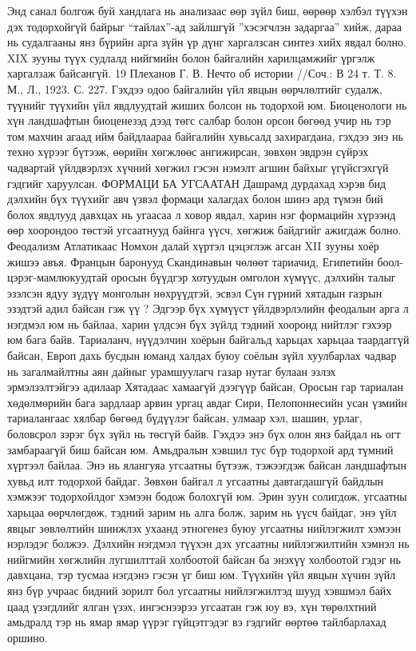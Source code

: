 Энд санал болгож буй хандлага нь анализаас өөр зүйл биш, өөрөөр хэлбэл түүхэн дэх тодорхойгүй байрыг “тайлах”-ад зайлшгүй ”хэсэгчлэн задаргаа” хийж, дараа нь судалгааны янз бүрийн арга зүйн үр дүнг харгалзсан синтез хийх явдал болно.
XIX зууны түүх судлалд нийгмийн болон байгалийн харилцамжийг үргэлж харгалзаж байсангүй.
19 Плеханов Г. В. Нечто об истории //Соч.: В 24 т. Т. 8. М., Л., 1923. С. 227.
Гэхдээ одоо байгалийн үйл явцын өөрчлөлтийг судалж, түүнийг түүхийн үйл явдлуудтай жиших болсон нь тодорхой юм. Биоценологи нь хүн ландшафтын биоценезэд дээд төгс салбар болон орсон бөгөөд учир нь тэр том махчин агаад ийм байдлаараа байгалийн хувьсалд захирагдана, гэхдээ энэ нь техно хүрээг бүтээж, өөрийн хөгжлөөс ангижирсан, зөвхөн эвдрэн сүйрэх чадвартай үйлдвэрлэх хүчний хөгжил гэсэн нэмэлт агшин байхыг үгүйсгэхгүй гэдгийг харуулсан.
ФОРМАЦИ БА УГСААТАН
Дашрамд дурдахад хэрэв бид дэлхийн бүх түүхийг авч үзвэл формаци халагдах болон шинэ ард түмэн бий болох явдлууд давхцах нь угаасаа л ховор явдал, харин нэг формацийн хүрээнд өөр хоорондоо төстэй угсаатнууд байнга үүсч, хөгжиж байдгийг ажигдаж болно.
Феодализм Атлатикаас Номхон далай хүртэл цэцэглэж агсан XII зууны хоёр жишээ авъя. Францын баронууд Скандинавын чөлөөт тариачид, Египетийн боол-цэрэг-мамлюкуудтай оросын бүүдгэр хотуудын омголон хүмүүс, дэлхийн талыг эзэлсэн ядуу зүдүү монголын нөхрүүдтэй, эсвэл Сүн гүрний хятадын газрын эзэдтэй адил байсан гэж үү ? Эдгээр бүх хүмүүст үйлдвэрлэлийн феодалын арга л нэгдмэл юм нь байлаа, харин үлдсэн бүх зүйлд тэдний хооронд нийтлэг гэхээр юм бага байв. Тариаланч, нүүдэлчин хоёрын байгальд харьцах харьцаа таардаггүй байсан, Европ дахь бусдын юманд халдах буюу соёлын зүйл хуулбарлах чадвар нь загалмайлтны аян дайныг урамшуулагч газар нутаг булаан эзлэх эрмэлзэлтэйгээ адилаар Хятадаас хамаагүй дээгүүр байсан, Оросын гар тариалан хөдөлмөрийн бага зардлаар арвин ургац авдаг Сири, Пелопоннесийн усан үзмийн тариалангаас хялбар бөгөөд бүдүүлэг байсан, улмаар хэл, шашин, урлаг, боловсрол зэрэг бүх зүйл нь төсгүй байв. Гэхдээ энэ бүх олон янз байдал нь огт замбараагүй биш байсан юм. Амьдралын хэвшил тус бүр тодорхой ард түмний хүртээл байлаа. Энэ нь ялангуяа угсаатны бүтээж, тэжээгдэж байсан ландшафтын хувьд илт тодорхой байдаг.
Зөвхөн байгал л угсаатны давтагдашгүй байдлын хэмжээг тодорхойлдог хэмээн бодож болохгүй юм. Эрин зуун солигдож, угсаатны харьцаа өөрчлөгдөж, тэдний зарим нь алга болж, зарим нь үүсч байдаг, энэ үйл явцыг зөвлөлтийн шинжлэх ухаанд этногенез буюу угсаатны нийлэгжилт хэмээн нэрлэдэг болжээ. Дэлхийн нэгдмэл түүхэн дэх угсаатны нийлэгжилтийн хэмнэл нь нийгмийн хөгжлийн лугшилттай холбоотой байсан ба энэхүү холбоотой гэдэг нь давхцана, тэр тусмаа нэгдэнэ гэсэн үг биш юм. Түүхийн үйл явцын хүчин зүйл янз бүр учраас бидний зорилт бол угсаатны нийлэгжилтэд шууд хэвшмэл байх цаад үзэгдлийг ялган үзэх, ингэснээрээ угсаатан гэж юу вэ, хүн төрөлхтний амьдралд тэр нь ямар ямар үүрэг гүйцэтгэдэг вэ гэдгийг өөртөө тайлбарлахад оршино.
